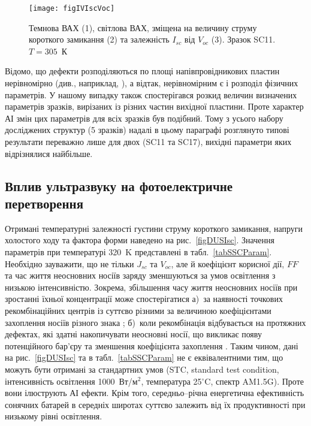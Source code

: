\begin{figure}
\center
\texttt{[image: figIVIscVoc]}%
\caption{\label{figIVIscVoc}
Темнова ВАХ (1),
світлова ВАХ, зміщена на величину струму короткого замикання (2)
та залежність $I_{sc}$ від $V_{oc}$ (3).
Зразок SC11.
$T=305$~К
}%
\end{figure}

Відомо, що дефекти розподіляються по площі напівпровідникових пластин нерівномірно (див., наприклад, \cite{Oxide:Chen,Oxide_Schon}),
а відтак, нерівномірним є і розподіл фізичних параметрів.
У нашому випадку також спостерігався розкид величин визначених параметрів зразків, вирізаних із різних частин вихідної пластини.
Проте характер АІ змін цих параметрів для всіх зразків був подібний.
Тому з усього набору досліджених структур (5 зразків) надалі в цьому параграфі розглянуто типові результати переважно лише для двох (SC11 та SC17),
вихідні параметри яких відрізнялися найбільше.



\subsection{Вплив ультразвуку на фотоелектричне перетворення}

Отримані температурні залежності густини струму короткого замикання, напруги холостого ходу та фактора форми наведено на рис.~\ref{figDUSIsc}.
Значення параметрів при температурі 320~K представлені в табл.~\ref{tabSSCParam}.
Необхідно зауважити, що не тільки $J_{sc}$ та $V_{oc}$, але й коефіцієнт корисної дії, $F\!F$ та час життя неосновних носіїв
заряду зменшуються за умов освітлення з низькою інтенсивністю\cite{LI:Ruhle,LI:Reich,LI:lifetime}.
Зокрема, збільшення часу життя неосновних носіїв при зростанні їхньої концентрації може спостерігатися
а)~за наявності точкових рекомбінаційних центрів із суттєво різними за величиною коефіцієнтами
захоплення носіїв різного знака \cite{Breitenstein2013,TauOnIph};
б)~коли рекомбінація відбувається на протяжних дефектах, які здатні накопичувати
неосновні носії, що викликає появу потенційного бар'єру та зменшення коефіцієнта захоплення \cite{Robinson1995,Schroter1995}.
Таким чином, дані на рис.~\ref{figDUSIsc} та в табл.~\ref{tabSSCParam} не є еквівалентними тим, що
можуть бути отримані за стандартних умов (STC, standard test condition, інтенсивність освітлення 1000~Вт/м$^2$,
температура 25$^{\circ}$C, спектр AM1.5G).
Проте вони ілюструють АІ ефекти.
Крім того, середньо--річна енергетична ефективність сонячних батарей в середніх широтах суттєво залежить від
їх продуктивності при низькому рівні освітлення.


